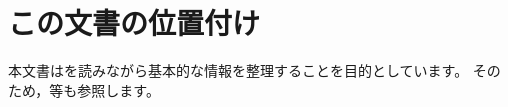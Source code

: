 \section{この文書の位置付け}

本文書は\cite{estrada2025gorensteincategoriesrelativegadmissible}を読みながら基本的な情報を整理することを目的としています。
そのため，\cite{hovey2007cotorsionpairsmodelcategories,becerril2019relativegorensteinobjectsabelian}等も参照します。
